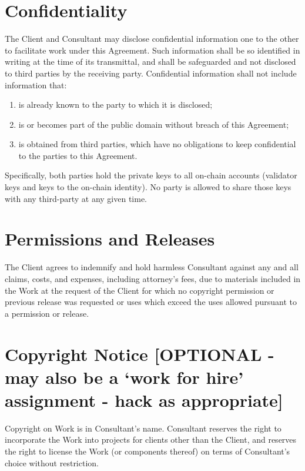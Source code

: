 \documentclass[10pt]{article}
\begin{document}
\section{Confidentiality}

The Client and Consultant may disclose confidential information one to the
other to facilitate work under this Agreement.  Such information shall be so
identified in writing at the time of its transmittal, and shall be
safeguarded and not disclosed to third parties by the receiving party.
Confidential information shall not include information that:

\begin{enumerate}
  \item is already known to the party to which it is disclosed; 
  \item is or becomes part of the public domain without breach of this Agreement;
  \item is obtained from third parties, which have no obligations to keep
    confidential to the parties to this Agreement. 
\end{enumerate}

Specifically, both parties hold the private keys to all on-chain accounts (validator keys and keys to the on-chain identity). No party is allowed to share those keys with any third-party at any given time.


\section{Permissions and Releases}

The Client agrees to indemnify and hold harmless Consultant against any and
all claims, costs, and expenses, including attorney's fees, due to materials
included in the Work at the request of the Client for which no copyright
permission or previous release was requested or uses which exceed the uses
allowed pursuant to a permission or release.  


\section{Copyright Notice [OPTIONAL - may also be a `work for hire' assignment - hack as appropriate]}

Copyright on Work is in Consultant's name.  Consultant reserves the right to incorporate the Work into projects for clients other than the Client, and reserves the right to license the Work (or components thereof) on terms of Consultant's choice without restriction.
\end{document}
